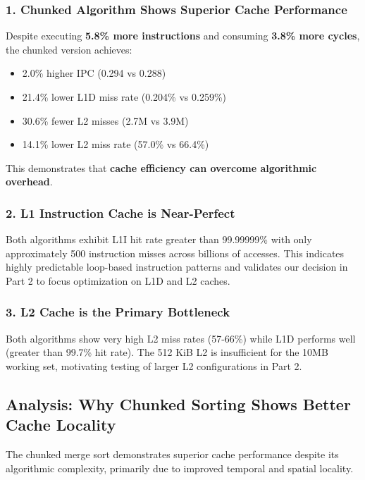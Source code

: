 \documentclass[12pt,a4paper]{article}
\begin{document}
\subsubsection{1. Chunked Algorithm Shows Superior Cache Performance}

Despite executing \textbf{5.8\% more instructions} and consuming \textbf{3.8\% more cycles}, the chunked version achieves:

\begin{itemize}
    \item 2.0\% higher IPC (0.294 vs 0.288)
    \item 21.4\% lower L1D miss rate (0.204\% vs 0.259\%)
    \item 30.6\% fewer L2 misses (2.7M vs 3.9M)
    \item 14.1\% lower L2 miss rate (57.0\% vs 66.4\%)
\end{itemize}

This demonstrates that \textbf{cache efficiency can overcome algorithmic overhead}.

\subsubsection{2. L1 Instruction Cache is Near-Perfect}

Both algorithms exhibit L1I hit rate greater than 99.99999\% with only approximately 500 instruction misses across billions of accesses. This indicates highly predictable loop-based instruction patterns and validates our decision in Part 2 to focus optimization on L1D and L2 caches.

\subsubsection{3. L2 Cache is the Primary Bottleneck}

Both algorithms show very high L2 miss rates (57-66\%) while L1D performs well (greater than 99.7\% hit rate). The 512 KiB L2 is insufficient for the 10MB working set, motivating testing of larger L2 configurations in Part 2.

\subsection{Analysis: Why Chunked Sorting Shows Better Cache Locality}

The chunked merge sort demonstrates superior cache performance despite its algorithmic complexity, primarily due to improved temporal and spatial locality.
\end{document}
